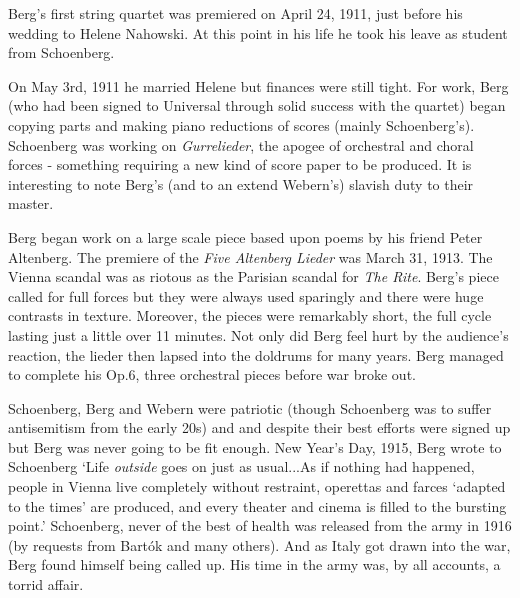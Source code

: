 Berg's first string quartet was premiered on April 24, 1911, just before his wedding to Helene Nahowski. At this point in his life he took his leave as student from Schoenberg. 

On May 3rd, 1911 he married Helene but finances were still tight. For work, Berg (who had been signed to Universal through solid success with the quartet) began copying parts and making piano reductions of scores (mainly Schoenberg's). Schoenberg was working on \textit{Gurrelieder}, the apogee of orchestral and choral forces - something requiring a new kind of score paper to be produced. It is interesting to note Berg's (and to an extend Webern's) slavish duty to their master.  

Berg began work on a large scale piece based upon poems by his friend Peter Altenberg. The premiere of the \textit{Five Altenberg Lieder} was March 31, 1913. The Vienna scandal was as riotous as the Parisian scandal for \textit{The Rite}. Berg's piece called for full forces but they were always used sparingly and there were huge contrasts in texture. Moreover, the pieces were remarkably short, the full cycle lasting just a little over 11 minutes. Not only did Berg feel hurt by the audience's reaction, the lieder then lapsed into the doldrums for many years. Berg managed to complete his Op.6, three orchestral pieces before war broke out. 

Schoenberg, Berg and Webern were patriotic (though Schoenberg was to suffer antisemitism from the early 20s) and and despite their best efforts were signed up but Berg was never going to be fit enough. New Year's Day, 1915, Berg wrote to Schoenberg `Life \textit{outside} goes on just as usual...As if nothing had happened, people in Vienna live completely without restraint, operettas and farces `adapted to the times' are produced, and every theater and cinema is filled to the bursting point.' Schoenberg, never of the best of health was released from the army in 1916 (by requests from Bart\'ok and many others). And as Italy got drawn into the war, Berg found himself being called up. His time in the army was, by all accounts, a torrid affair.  

